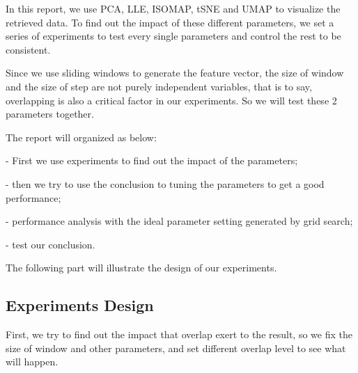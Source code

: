 \documentclass[conference]{IEEEtran}
\begin{document}
In this report, we use PCA, LLE, ISOMAP, tSNE and UMAP to visualize the retrieved data.
To find out the impact of these different parameters, we set a series of experiments
to test every single parameters and control the rest to be consistent.

Since we use sliding windows to generate the feature vector,
the size of window and the size of step are not purely independent variables,
that is to say, overlapping is also a critical factor in our experiments.
So we will test these 2 parameters together.

The report will organized as below:

- First we use experiments to find out the impact of the parameters;

- then we try to use the conclusion to tuning the parameters to get a good performance;

- performance analysis with the ideal parameter setting generated by grid search;

- test our conclusion.

The following part will illustrate the design of our experiments.

\subsection{Experiments Design}
First, we try to find out the impact that overlap exert to the result,
so we fix the size of window and other parameters, 
and set different overlap level to see what will happen.
\end{document}
